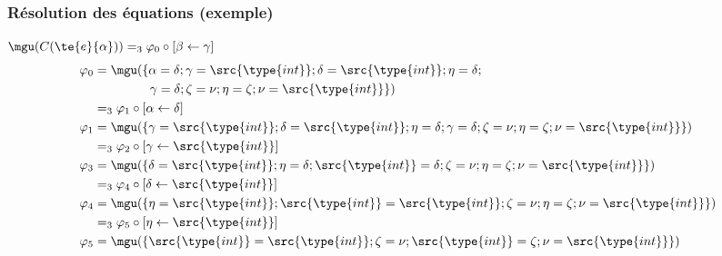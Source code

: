 %
\begin{frame}
\frametitle{Résolution des équations (exemple)}

$\mgu(C(\te{e}{\alpha})) =_3 \varphi_0 \circ [\beta \leftarrow
\gamma]$
{\small
\begin{align*}
  \varphi_0 &= \mgu(\{\alpha = \delta; \gamma = \src{\type{int}};
  \delta = \src{\type{int}}; \eta = \delta;\\
            &\phantom{=\mgu(\{)} \gamma = \delta; \zeta =
  \nu; \eta = \zeta; \nu = \src{\type{int}}\})\\
            &=_3 \varphi_1 \circ [\alpha \leftarrow \delta]\\
  \varphi_1 &= \mgu(\{\gamma = \src{\type{int}};
  \delta = \src{\type{int}}; \eta = \delta; \gamma = \delta; \zeta =
  \nu; \eta = \zeta; \nu = \src{\type{int}}\})\\
            &=_3 \varphi_2 \circ [\gamma \leftarrow \src{\type{int}}]\\
  \varphi_3 &= \mgu(\{\delta = \src{\type{int}}; \eta = \delta;
  \src{\type{int}} = \delta; \zeta = \nu; \eta = \zeta; \nu =
  \src{\type{int}}\})\\
            &=_3 \varphi_4 \circ [\delta \leftarrow \src{\type{int}}]\\
  \varphi_4 &= \mgu(\{\eta = \src{\type{int}}; \src{\type{int}} =
  \src{\type{int}}; \zeta = \nu; \eta = \zeta; \nu =
  \src{\type{int}}\})\\
            &=_3 \varphi_5 \circ [\eta \leftarrow \src{\type{int}}]\\
  \varphi_5 &= \mgu(\{\src{\type{int}} = \src{\type{int}}; \zeta =
  \nu; \src{\type{int}} = \zeta; \nu = \src{\type{int}}\})
\end{align*}
}

\end{frame}

